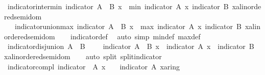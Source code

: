 \begin{isabellebody}
\endisatagproof
{\isafoldproof}%
%
\isadelimproof
\isanewline
%
\endisadelimproof
\isanewline
{}\isamarkupfalse%
\ indicator{\isacharunderscore}inter{\isacharunderscore}min{\isacharcolon}\ {\isachardoublequoteopen}indicator\ {\isacharparenleft}A\ {\isasyminter}\ B{\isacharparenright}\ x\ {\isacharequal}\ min\ {\isacharparenleft}indicator\ A\ x{\isacharparenright}\ {\isacharparenleft}indicator\ B\ x{\isacharcolon}{\isacharcolon}{\isacharprime}a{\isacharcolon}{\isacharcolon}linordered{\isacharunderscore}semidom{\isacharparenright}{\isachardoublequoteclose}\isanewline
\ \ \ indicator{\isacharunderscore}union{\isacharunderscore}max{\isacharcolon}\ {\isachardoublequoteopen}indicator\ {\isacharparenleft}A\ {\isasymunion}\ B{\isacharparenright}\ x\ {\isacharequal}\ max\ {\isacharparenleft}indicator\ A\ x{\isacharparenright}\ {\isacharparenleft}indicator\ B\ x{\isacharcolon}{\isacharcolon}{\isacharprime}a{\isacharcolon}{\isacharcolon}linordered{\isacharunderscore}semidom{\isacharparenright}{\isachardoublequoteclose}\isanewline
%
\isadelimproof
\ \ %
\endisadelimproof
%
\isatagproof
{}\isamarkupfalse%
\ indicator{\isacharunderscore}def\ \isamarkupfalse%
\ {\isacharparenleft}auto\ simp{\isacharcolon}\ min{\isacharunderscore}def\ max{\isacharunderscore}def{\isacharparenright}%
\endisatagproof
{\isafoldproof}%
%
\isadelimproof
\isanewline
%
\endisadelimproof
\isanewline
{}\isamarkupfalse%
\ indicator{\isacharunderscore}disj{\isacharunderscore}union{\isacharcolon}\ {\isachardoublequoteopen}A\ {\isasyminter}\ B\ {\isacharequal}\ {\isacharbraceleft}{\isacharbraceright}\ {\isasymLongrightarrow}\ \ indicator\ {\isacharparenleft}A\ {\isasymunion}\ B{\isacharparenright}\ x\ {\isacharequal}\ {\isacharparenleft}indicator\ A\ x\ {\isacharplus}\ indicator\ B\ x{\isacharcolon}{\isacharcolon}{\isacharprime}a{\isacharcolon}{\isacharcolon}linordered{\isacharunderscore}semidom{\isacharparenright}{\isachardoublequoteclose}\isanewline
%
\isadelimproof
\ \ %
\endisadelimproof
%
\isatagproof
{}\isamarkupfalse%
\ {\isacharparenleft}auto\ split{\isacharcolon}\ split{\isacharunderscore}indicator{\isacharparenright}%
\endisatagproof
{\isafoldproof}%
%
\isadelimproof
\isanewline
%
\endisadelimproof
\isanewline
{}\isamarkupfalse%
\ indicator{\isacharunderscore}compl{\isacharcolon}\ {\isachardoublequoteopen}indicator\ {\isacharparenleft}{\isacharminus}\ A{\isacharparenright}\ x\ {\isacharequal}\ {}\ {\isacharminus}\ {\isacharparenleft}indicator\ A\ x{\isacharcolon}{\isacharcolon}{\isacharprime}a{\isacharcolon}{\isacharcolon}ring{\isacharunderscore}{}{\isacharparenright}{\isachardoublequoteclose}\isanewline

\end{isabellebody}
